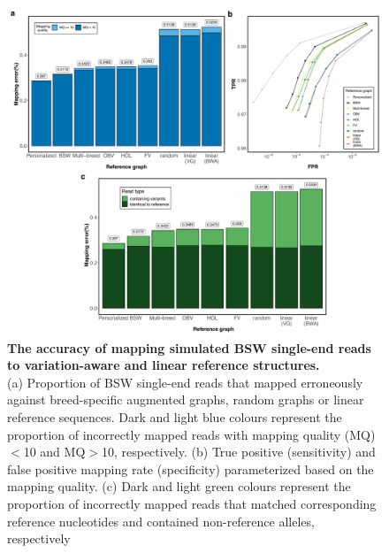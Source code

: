 \documentclass[../main.tex]{subfiles}
\begin{document}
\begin{flushleft}
\begin{figure}[!htb]
    \centering
    \includegraphics[width=\textwidth]{paper2/supplement/sp37.pdf}
    \caption[The accuracy of mapping simulated BSW single-end reads]{\textbf{The accuracy of mapping simulated BSW single-end reads to
    variation-aware and linear reference structures.} \\
    \small{(a) Proportion of BSW single-end reads that mapped erroneously against breed-specific
    augmented graphs, random graphs or linear reference sequences. Dark and light blue
    colours represent the proportion of incorrectly mapped reads with mapping quality (MQ)$<$10
    and MQ$>$10, respectively. (b) True positive (sensitivity) and false positive mapping rate
    (specificity) parameterized based on the mapping quality. (c) Dark and light green colours
    represent the proportion of incorrectly mapped reads that matched corresponding reference
    nucleotides and contained non-reference alleles, respectively}}
    \label{sup_fig:s37}
\end{figure}



\end{flushleft}
\end{document}
